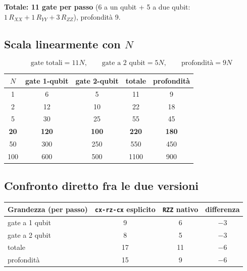 \documentclass[11pt,a4paper]{article}
\begin{document}
\begin{keyeq}
\centering
\textbf{Totale: 11 gate per passo} (6 a un qubit + 5 a due qubit:
$1\,R_{XX}+1\,R_{YY}+3\,R_{ZZ}$), profondità 9.
\end{keyeq}

\subsection*{Scala linearmente con $N$}

$$\text{gate totali} = 11N, \qquad \text{gate a 2 qubit} = 5N, \qquad \text{profondità} = 9N$$

\begin{center}
\renewcommand{\arraystretch}{1.2}
\begin{tabular}{@{}ccccc@{}}
\toprule
\rowcolor{inkblue!10}
$N$ & gate 1-qubit & gate 2-qubit & totale & profondità\\
\midrule
1 & 6 & 5 & 11 & 9\\
2 & 12 & 10 & 22 & 18\\
5 & 30 & 25 & 55 & 45\\
\textbf{20} & \textbf{120} & \textbf{100} & \textbf{220} & \textbf{180}\\
50 & 300 & 250 & 550 & 450\\
100 & 600 & 500 & 1100 & 900\\
\bottomrule
\end{tabular}
\end{center}

\subsection*{Confronto diretto fra le due versioni}

\begin{center}
\renewcommand{\arraystretch}{1.25}
\begin{tabular}{@{}lccc@{}}
\toprule
\rowcolor{inkblue!10}
\textbf{Grandezza (per passo)} & \texttt{cx-rz-cx} esplicito & \texttt{RZZ} nativo & differenza\\
\midrule
gate a 1 qubit & 9 & 6 & $-3$\\
gate a 2 qubit & 8 & 5 & $-3$\\
totale & 17 & 11 & $-6$\\
profondità & 15 & 9 & $-6$\\
\bottomrule
\end{tabular}
\end{center}
\end{document}
